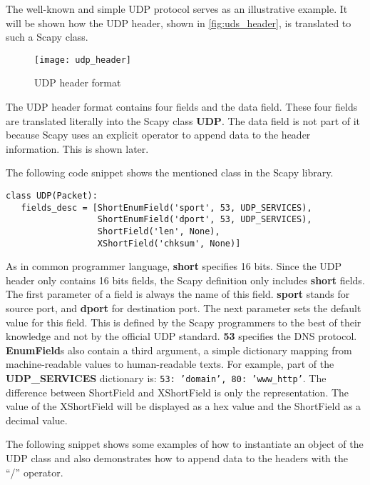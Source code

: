 The well-known and simple UDP protocol \cite{rfc768} serves as an illustrative example. It will be shown how the UDP header, shown in \autoref{fig:uds_header}, is translated to such a Scapy class.

\begin{figure}[h]
    \centering
    \texttt{[image: udp\_header]}
    \caption{UDP header format \cite{udp_header}}
    \label{fig:uds_header}
\end{figure}

The UDP header format contains four fields and the data field. These four fields are translated literally into the Scapy class \textbf{UDP}. The data field is not part of it because Scapy uses an explicit operator to append data to the header information. This is shown later.

The following code snippet shows the mentioned class in the Scapy library.

\begin{samepage}
\begin{verbatim}
class UDP(Packet):
   fields_desc = [ShortEnumField('sport', 53, UDP_SERVICES),
                  ShortEnumField('dport', 53, UDP_SERVICES),
                  ShortField('len', None),
                  XShortField('chksum', None)]
\end{verbatim}
\end{samepage}

As in common programmer language, \textbf{short} specifies 16 bits. Since the UDP header only contains 16 bits fields, the Scapy definition only includes \textbf{short} fields. The first parameter of a field is always the name of this field. \textbf{sport} stands for source port, and \textbf{dport} for destination port.
The next parameter sets the default value for this field. This is defined by the Scapy programmers to the best of their knowledge and not by the official UDP standard. \textbf{53} specifies the DNS protocol.
\textbf{EnumField}s also contain a third argument, a simple dictionary mapping from machine-readable values to human-readable texts. For example, part of the \textbf{UDP\_SERVICES} dictionary is: \texttt{{53: 'domain', 80: 'www_http'}}.
The difference between ShortField and XShortField is only the representation. The value of the XShortField will be displayed as a hex value and the ShortField as a decimal value.

The following snippet shows some examples of how to instantiate an object of the UDP class and also demonstrates how to append data to the headers with the “/” operator.

